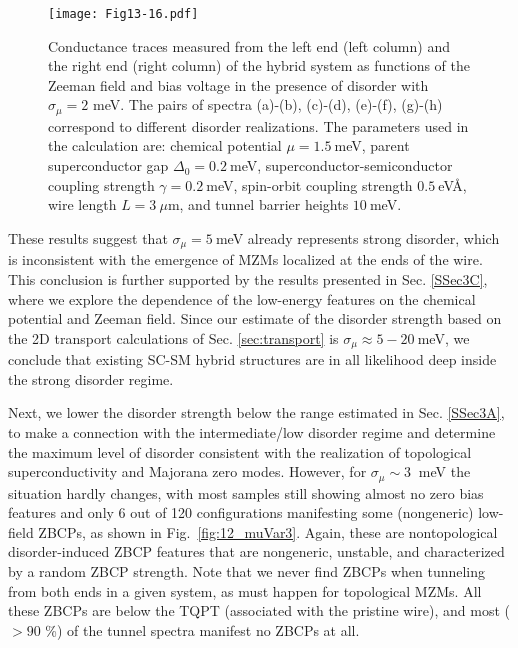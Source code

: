 \documentclass[aps,prmaterials,twocolumn,superscriptaddress,longbibliography]{revtex4-2}
\begin{document}
\begin{figure}[h]
    \centering
    \texttt{[image: Fig13-16.pdf]}
    \caption{Conductance traces measured from the left end (left column) and the right end (right column) of the hybrid system as functions of the Zeeman field and bias voltage in the presence of disorder with $\sigma_\mu=2$ meV. The pairs of spectra (a)-(b), (c)-(d), (e)-(f), (g)-(h) correspond to different disorder realizations. The parameters used in the calculation are: chemical potential $\mu=1.5~$meV, parent superconductor gap $\Delta_0=0.2~$meV, superconductor-semiconductor coupling strength $\gamma=0.2~$meV, spin-orbit coupling strength $0.5~$eV\AA, wire length $L=3~\mu$m, and tunnel barrier heights $10~$meV.}
    \label{fig:13-16_muVar2}
\end{figure}

These results suggest that $\sigma_\mu = 5~$meV already represents strong disorder, which is inconsistent with the emergence of MZMs localized at the ends of the wire. This conclusion is further supported by the results presented in  Sec. \ref{SSec3C}, where we explore the dependence of the low-energy features on the chemical potential and Zeeman field. Since our estimate of the disorder strength based on the  2D transport calculations of Sec. \ref{sec:transport} is $\sigma_\mu \approx 5-20~$meV, we conclude that existing SC-SM hybrid structures are in all likelihood deep inside the strong disorder regime. 

Next, we lower the disorder strength below the range estimated in Sec. \ref{SSec3A}, to make a connection with the intermediate/low disorder regime and determine the maximum level of disorder consistent with the realization of topological superconductivity and Majorana zero modes. 
However, for $\sigma_\mu \sim 3~$ meV the situation hardly changes, with most samples still showing almost no zero bias features and only  6 out of 120 configurations manifesting some (nongeneric) low-field ZBCPs,  as shown in Fig.~\ref{fig:12_muVar3}. Again, these are nontopological disorder-induced ZBCP features that are nongeneric, unstable, and characterized by a random ZBCP strength. Note that we never find ZBCPs when tunneling from both ends in a given system, as must happen for topological MZMs.  All these ZBCPs are below the TQPT (associated with the pristine wire), and most ($>90$ \%) of the tunnel spectra manifest no ZBCPs at all. 
\end{document}
